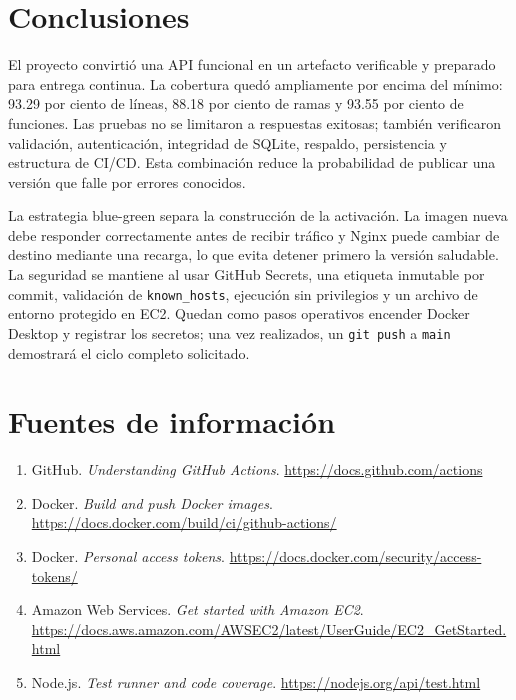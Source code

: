 \documentclass[12pt,letterpaper]{article}
\begin{document}
\section{Conclusiones}
El proyecto convirtió una API funcional en un artefacto verificable y preparado para entrega continua. La cobertura quedó ampliamente por encima del mínimo: 93.29 por ciento de líneas, 88.18 por ciento de ramas y 93.55 por ciento de funciones. Las pruebas no se limitaron a respuestas exitosas; también verificaron validación, autenticación, integridad de SQLite, respaldo, persistencia y estructura de CI/CD. Esta combinación reduce la probabilidad de publicar una versión que falle por errores conocidos.

La estrategia blue-green separa la construcción de la activación. La imagen nueva debe responder correctamente antes de recibir tráfico y Nginx puede cambiar de destino mediante una recarga, lo que evita detener primero la versión saludable. La seguridad se mantiene al usar GitHub Secrets, una etiqueta inmutable por commit, validación de \texttt{known\_hosts}, ejecución sin privilegios y un archivo de entorno protegido en EC2. Quedan como pasos operativos encender Docker Desktop y registrar los secretos; una vez realizados, un \texttt{git push} a \texttt{main} demostrará el ciclo completo solicitado.

\section{Fuentes de información}
\begin{enumerate}
\item GitHub. \textit{Understanding GitHub Actions}. \url{https://docs.github.com/actions}
\item Docker. \textit{Build and push Docker images}. \url{https://docs.docker.com/build/ci/github-actions/}
\item Docker. \textit{Personal access tokens}. \url{https://docs.docker.com/security/access-tokens/}
\item Amazon Web Services. \textit{Get started with Amazon EC2}. \url{https://docs.aws.amazon.com/AWSEC2/latest/UserGuide/EC2_GetStarted.html}
\item Node.js. \textit{Test runner and code coverage}. \url{https://nodejs.org/api/test.html}
\end{enumerate}
\end{document}
